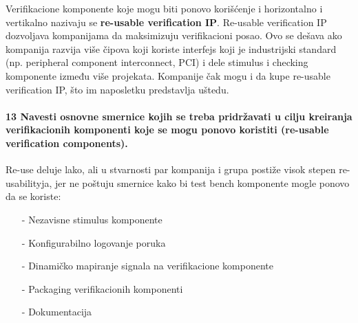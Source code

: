 \documentclass[a4paper, 12pt]{article}
\begin{document}
\indent Verifikacione komponente koje mogu biti ponovo korišćenje i horizontalno i vertikalno nazivaju se \textbf{re-usable verification IP}. Re-usable verification IP dozvoljava kompanijama da maksimizuju verifikacioni posao. Ovo se dešava ako kompanija razvija više čipova koji koriste interfejs koji je industrijski standard (np. peripheral component interconnect, PCI) i dele stimulus i checking komponente između više projekata.  Kompanije čak mogu i da kupe re-usable verification IP, što im naposletku predstavlja uštedu. 
\paragraph{13 Navesti osnovne smernice kojih se treba pridržavati u cilju kreiranja verifikacionih komponenti koje se mogu ponovo koristiti (re-usable verification components).}
\hfill \break
\indent Re-use deluje lako, ali u stvarnosti par kompanija i grupa postiže visok stepen re-usabilityja, jer ne poštuju smernice kako bi test bench komponente mogle ponovo da se koriste:
\begin{itemize}
\item[-] Nezavisne stimulus komponente
\item[-] Konfigurabilno logovanje poruka
\item[-] Dinamičko mapiranje signala na verifikacione komponente
\item[-] Packaging verifikacionih komponenti
\item[-] Dokumentacija
\end{itemize}
\end{document}
